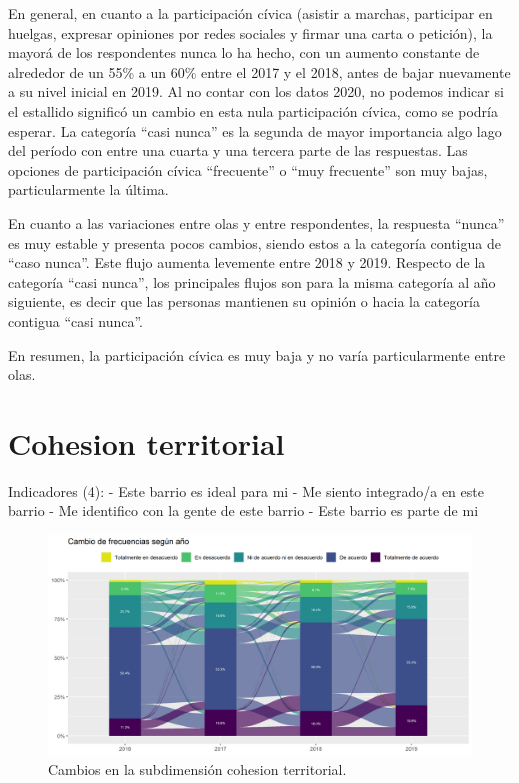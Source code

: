 \documentclass[
  12pt,
]{book}
\begin{document}
En general, en cuanto a la participación cívica (asistir a marchas, participar en huelgas, expresar opiniones por redes sociales y firmar una carta o petición), la mayorá de los respondentes nunca lo ha hecho, con un aumento constante de alrededor de un 55\% a un 60\% entre el 2017 y el 2018, antes de bajar nuevamente a su nivel inicial en 2019. Al no contar con los datos 2020, no podemos indicar si el estallido significó un cambio en esta nula participación cívica, como se podría esperar. La categoría ``casi nunca'' es la segunda de mayor importancia algo lago del período con entre una cuarta y una tercera parte de las respuestas. Las opciones de participación cívica ``frecuente'' o ``muy frecuente'' son muy bajas, particularmente la última.

En cuanto a las variaciones entre olas y entre respondentes, la respuesta ``nunca'' es muy estable y presenta pocos cambios, siendo estos a la categoría contigua de ``caso nunca''. Este flujo aumenta levemente entre 2018 y 2019. Respecto de la categoría ``casi nunca'', los principales flujos son para la misma categoría al año siguiente, es decir que las personas mantienen su opinión o hacia la categoría contigua ``casi nunca''.

En resumen, la participación cívica es muy baja y no varía particularmente entre olas.

\hypertarget{cohesion-territorial}{%
\section{Cohesion territorial}\label{cohesion-territorial}}

Indicadores (4):
- Este barrio es ideal para mi
- Me siento integrado/a en este barrio
- Me identifico con la gente de este barrio
- Este barrio es parte de mi

\begin{figure}[H]

{\centering \includegraphics[width=1\linewidth,height=1\textheight]{output/graphs/alluvial_cohesion_territorial} 

}

\caption{Cambios en la subdimensión cohesion territorial.}\label{fig:alluvial-cohesion-territorial}
\end{figure}
\end{document}
